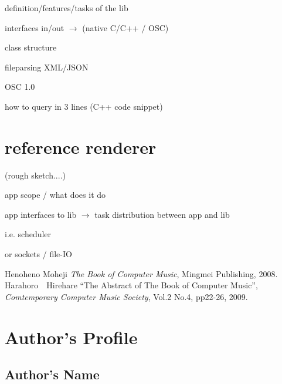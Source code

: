 \documentclass{article}
\begin{document}
definition/features/tasks of the lib

interfaces in/out $\rightarrow$ (native C/C++ / OSC)

class structure


fileparsing XML/JSON

OSC 1.0

how to query in 3 lines (C++ code snippet)

\section{reference renderer }%

(rough sketch....)

app scope / what does it do

app interfaces to lib $\rightarrow$ task distribution between app and lib

i.e. scheduler

or sockets / file-IO




\begin{thebibliography}{citations}
 Henoheno Moheji {\it The Book of Computer Music},
	Mingmei Publishing, 2008.
 Harahoro　Hirehare ``The Abstract of The Book of
	Computer Music'', {\it Comtemporary Computer Music Society},
	Vol.2 No.4, pp22-26, 2009.
\end{thebibliography}

\section{Author's Profile}


\subsection*{Author's Name}
\end{document}

